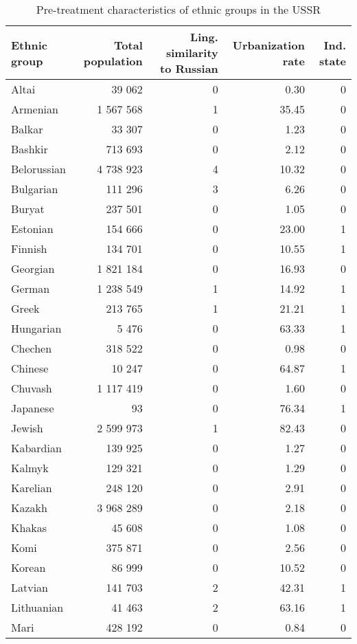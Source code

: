\begin{table}[!h]

\caption{\label{tab:sc_predictors}Pre-treatment characteristics of ethnic groups in the USSR}
\centering
\begin{threeparttable}
\begin{tabular}{lrrrr}
\toprule
Ethnic group & Total population & Ling. similarity to Russian & Urbanization rate & Ind. state\\
\midrule
Altai & 39 062 & 0 & 0.30 & 0\\
Armenian & 1 567 568 & 1 & 35.45 & 0\\
Balkar & 33 307 & 0 & 1.23 & 0\\
Bashkir & 713 693 & 0 & 2.12 & 0\\
Belorussian & 4 738 923 & 4 & 10.32 & 0\\
Bulgarian & 111 296 & 3 & 6.26 & 0\\
Buryat & 237 501 & 0 & 1.05 & 0\\
Estonian & 154 666 & 0 & 23.00 & 1\\
Finnish & 134 701 & 0 & 10.55 & 1\\
Georgian & 1 821 184 & 0 & 16.93 & 0\\
German & 1 238 549 & 1 & 14.92 & 1\\
Greek & 213 765 & 1 & 21.21 & 1\\
Hungarian & 5 476 & 0 & 63.33 & 1\\
Chechen & 318 522 & 0 & 0.98 & 0\\
Chinese & 10 247 & 0 & 64.87 & 1\\
Chuvash & 1 117 419 & 0 & 1.60 & 0\\
Japanese & 93 & 0 & 76.34 & 1\\
Jewish & 2 599 973 & 1 & 82.43 & 0\\
Kabardian & 139 925 & 0 & 1.27 & 0\\
Kalmyk & 129 321 & 0 & 1.29 & 0\\
Karelian & 248 120 & 0 & 2.91 & 0\\
Kazakh & 3 968 289 & 0 & 2.18 & 0\\
Khakas & 45 608 & 0 & 1.08 & 0\\
Komi & 375 871 & 0 & 2.56 & 0\\
Korean & 86 999 & 0 & 10.52 & 0\\
Latvian & 141 703 & 2 & 42.31 & 1\\
Lithuanian & 41 463 & 2 & 63.16 & 1\\
Mari & 428 192 & 0 & 0.84 & 0\\

\end{tabular}
\end{threeparttable}
\end{table}
